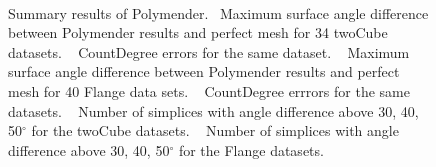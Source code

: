 \begin{figure}[htb]
		\\
		\caption{Summary results of Polymender.~\protect{} Maximum surface angle difference between Polymender results and perfect mesh for 34 twoCube datasets. 
			~\protect{} CountDegree errors for the same dataset.
			~\protect{} Maximum surface angle difference between Polymender results and perfect mesh for 40 Flange data sets.
			~\protect{} CountDegree errrors for the same datasets. 
			~\protect{} Number of simplices with angle difference above 30, 40, 50$^\circ$ for the twoCube datasets.
			~\protect{} Number of simplices with angle difference above 30, 40, 50$^\circ$ for the Flange datasets.}	
		\label{fig:polymenderA}
\end{figure}
